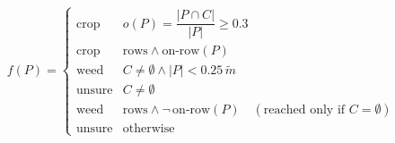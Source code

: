 \documentclass[varwidth=17cm,border=10pt]{standalone}
\begin{document}
\Large
$$f(P)=\begin{cases}
\text{crop}   & o(P)=\dfrac{|P\cap C|}{|P|}\ge 0.3\\[4pt]
\text{crop}   & \text{rows}\wedge\text{on-row}(P)\\[2pt]
\text{weed}   & C\neq\emptyset\wedge|P|<0.25\,\tilde m\\[2pt]
\text{unsure} & C\neq\emptyset\\[2pt]
\text{weed}   & \text{rows}\wedge\neg\,\text{on-row}(P)\quad(\text{reached only if } C=\emptyset)\\[2pt]
\text{unsure} & \text{otherwise}
\end{cases}$$
\end{document}
